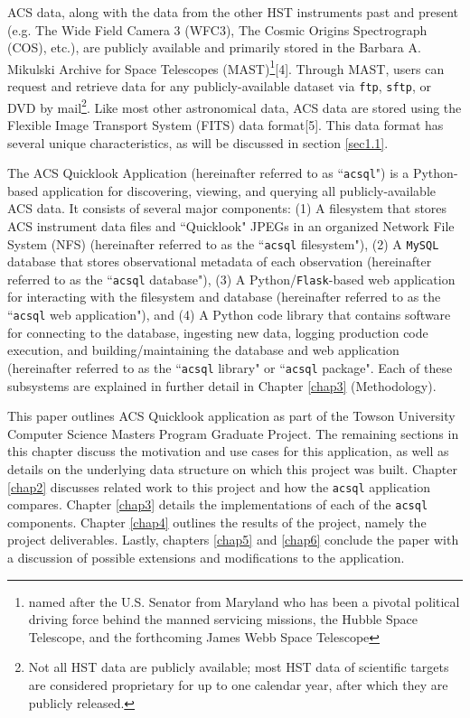 \documentclass[10pt,journal,compsoc]{IEEEtran}
\begin{document}
ACS data, along with the data from the other HST instruments past and present (e.g. The Wide Field Camera 3 (WFC3), The Cosmic Origins
Spectrograph (COS), etc.), are publicly available and primarily stored in the Barbara A. Mikulski Archive for Space Telescopes
(MAST)\footnote{named after the U.S. Senator from Maryland who has been a pivotal political driving force behind the manned servicing
missions, the Hubble Space Telescope, and the forthcoming James Webb Space Telescope}[4]. Through MAST, users can request and retrieve
data for any publicly-available dataset via \texttt{ftp}, \texttt{sftp}, or DVD by mail\footnote{Not all HST data are publicly available;
most HST data of scientific targets are considered proprietary for up to one calendar year, after which they are publicly released.}. Like most
other astronomical data, ACS data are stored using the Flexible Image Transport System (FITS) data format[5].  This data format has several
unique characteristics, as will be discussed in section \ref{sec1.1}.

The ACS Quicklook Application (hereinafter referred to as ``\texttt{acsql}") is a Python-based application for discovering, viewing, and
querying all publicly-available ACS data.  It consists of several major components: (1) A filesystem that stores ACS instrument data files
and ``Quicklook" JPEGs in an organized Network File System (NFS) (hereinafter referred to as the ``\texttt{acsql} filesystem"), (2) A
\texttt{MySQL} database that stores observational metadata of each observation (hereinafter referred to as the ``\texttt{acsql} database"),
(3) A Python/\texttt{Flask}-based web application for interacting with the filesystem and database (hereinafter referred to as the
``\texttt{acsql} web application"), and (4) A Python code library that contains software for connecting to the database, ingesting new data,
logging production code execution, and building/maintaining the database and web application (hereinafter referred to as the ``\texttt{acsql} library"
or ``\texttt{acsql} package".  Each of these subsystems are explained in further detail in Chapter \ref{chap3} (Methodology).

This paper outlines ACS Quicklook application as part of the Towson University Computer Science Masters Program Graduate Project.  The remaining
sections in this chapter discuss the motivation and use cases for this application, as well as details on the underlying data structure on
which this project was built.  Chapter \ref{chap2} discusses related work to this project and how the \texttt{acsql} application compares.
Chapter \ref{chap3} details the implementations of each of the \texttt{acsql} components.  Chapter \ref{chap4} outlines the results of the project, namely
the project deliverables.  Lastly, chapters \ref{chap5} and \ref{chap6} conclude the paper with a discussion of possible extensions and modifications to
the application.
\end{document}
